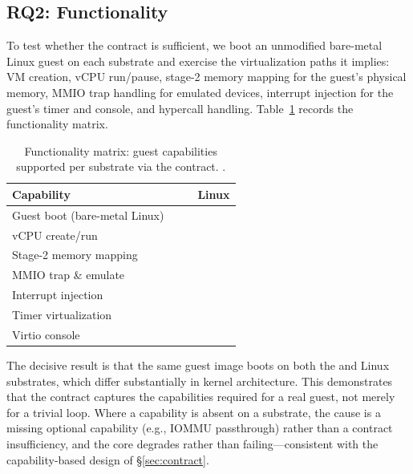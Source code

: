 \subsection{RQ2: Functionality}

To test whether the contract is sufficient, we boot an unmodified bare-metal
Linux guest on each substrate and exercise the virtualization paths it implies:
VM creation, vCPU run/pause, stage-2 memory mapping for the guest's physical
memory, MMIO trap handling for emulated devices, interrupt injection for the
guest's timer and console, and hypercall handling.
Table~\ref{tab:functionality} records the functionality matrix.

\begin{table}[t]
  \centering
  \caption{Functionality matrix: guest capabilities supported per substrate via
  the contract. .}
  \label{tab:functionality}
  \begin{tabular}{@{}lccc@{}}
    \toprule
    \textbf{Capability} & \textbf{\arceos{}} & \textbf{\asterinas{}} &
      \textbf{Linux} \\
    \midrule
    Guest boot (bare-metal Linux) & \fillme{} & \fillme{} & \fillme{} \\
    vCPU create/run               & \fillme{} & \fillme{} & \fillme{} \\
    Stage-2 memory mapping        & \fillme{} & \fillme{} & \fillme{} \\
    MMIO trap \& emulate          & \fillme{} & \fillme{} & \fillme{} \\
    Interrupt injection           & \fillme{} & \fillme{} & \fillme{} \\
    Timer virtualization          & \fillme{} & \fillme{} & \fillme{} \\
    Virtio console                & \fillme{} & \fillme{} & \fillme{} \\
    \bottomrule
  \end{tabular}
\end{table}

The decisive result is that the same guest image boots on both the \asterinas{}
and Linux substrates, which differ substantially in kernel architecture. This
demonstrates that the contract captures the capabilities required for a real
guest, not merely for a trivial loop. Where a capability is absent on a
substrate, the cause is a missing optional capability (e.g., IOMMU passthrough)
rather than a contract insufficiency, and the core degrades rather than
failing---consistent with the capability-based design of \S\ref{sec:contract}.

